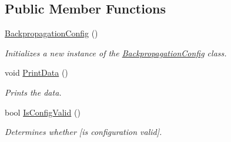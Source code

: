 \subsection*{Public Member Functions}
\begin{DoxyCompactItemize}
\item 
\hyperlink{class_backpropagation_config_a52af8244ad7e5554ebbeedea47ddff2a}{Backpropagation\+Config} ()
\begin{DoxyCompactList}\small\item\em Initializes a new instance of the \hyperlink{class_backpropagation_config}{Backpropagation\+Config} class. \end{DoxyCompactList}\item 
void \hyperlink{class_backpropagation_config_aa9e60f952307833c8ebf84d1bce21ea0}{Print\+Data} ()
\begin{DoxyCompactList}\small\item\em Prints the data. \end{DoxyCompactList}\item 
bool \hyperlink{class_backpropagation_config_a64c50d10f6091ea19a2ec5db6481437e}{Is\+Config\+Valid} ()
\begin{DoxyCompactList}\small\item\em Determines whether \mbox{[}is configuration valid\mbox{]}. \end{DoxyCompactList}\end{DoxyCompactItemize}
